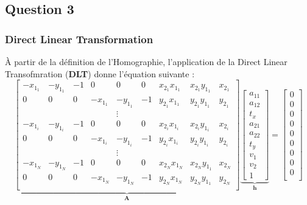 \documentclass[../5RO17_TP1.tex]{subfiles}
\begin{document}
\subsection{Question 3}

\subsubsection{Direct Linear Transformation}
\noindent À partir de la définition de l'Homographie, l'application de la Direct Linear Transofmration (\textbf{DLT}) donne l'équation suivante :
\begin{equation}
    \underbrace{
        \begin{bmatrix}
            -x_{1_{1}} & -y_{1_{1}} & -1 & 0 & 0 & 0 & x_{2_{1}} x_{1_{1}} & x_{2_{1}} y_{1_{1}} & x_{2_{1}}\\
            0 & 0 & 0 & -x_{1_{1}} & -y_{1_{1}} & -1 & y_{2_{1}} x_{1_{1}} & y_{2_{1}} y_{1_{1}} & y_{2_{1}}\\
            & & & & \vdots\\
            -x_{1_{i}} & -y_{1_{i}} & -1 & 0 & 0 & 0 & x_{2_{i}} x_{1_{i}} & x_{2_{i}} y_{1_{i}} & x_{2_{i}}\\
            0 & 0 & 0 & -x_{1_{i}} & -y_{1_{i}} & -1 & y_{2_{i}} x_{1_{i}} & y_{2_{i}} y_{1_{i}} & y_{2_{i}}\\
            & & & & \vdots\\
            -x_{1_{N}} & -y_{1_{N}} & -1 & 0 & 0 & 0 & x_{2_{N}} x_{1_{N}} & x_{2_{N}} y_{1_{1}} & x_{2_{N}}\\
            0 & 0 & 0 & -x_{1_{N}} & -y_{1_{N}} & -1 & y_{2_{N}} x_{1_{N}} & y_{2_{N}} y_{1_{1}} & y_{2_{N}}\\
        \end{bmatrix}
    }_{\mathbf{A}}
    \underbrace{
        \begin{bmatrix}
            a_{11}\\ a_{12}\\ t_{x}\\ a_{21}\\ a_{22}\\ t_{y}\\ v_{1}\\ v_{2}\\ 1
        \end{bmatrix}
    }_{\mathbf{h}}
    =
    \begin{bmatrix}
        0\\ 0\\ 0\\ 0\\ 0\\ 0\\ 0\\ 0\\ 0\\
    \end{bmatrix}
\end{equation}
\end{document}
